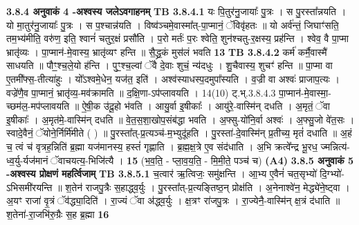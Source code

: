 \documentclass[17pt]{extarticle}
\begin{document}
{{{{{{{{{{{{{{{{{{{{{{                \textbf{ 3.8.4     अनुवाकं   4 -अश्वस्य जलेऽवगाहनम्} \newline
                                \textbf{ TB 3.8.4.1} \newline
                  यः पि॒तुर॑नु॒जायाः᳚ पु॒त्रः । स पु॒रस्ता᳚न्नयति । यो मा॒तुर॑नु॒जायाः᳚ पु॒त्रः । स प॒श्चान्न॑यति । विष्व॑ञ्चमे॒वास्मा᳚त्-पा॒प्मानं॒ ॅविवृ॑हतः ॥ यो अर्व॑न्तं॒ जिघाꣳ॑सति॒ तम॒भ्य॑मीति॒ वरु॑ण॒ इति॒ श्वानं॑ चतुर॒क्षं प्रसौ॑ति । प॒रो मर्तः॑ प॒रः श्वेति॒ शुन॑श्चतु-र॒क्षस्य॒ प्रह॑न्ति । श्वेव॒ वै पा॒प्मा भ्रातृ॑व्यः । पा॒प्मान॑-मे॒वास्य॒ भ्रातृ॑व्यꣳ हन्ति ॥ सै॒द्ध्र॒कं मुस॑लं भवति \textbf{ 13} \newline
                  \newline
                                \textbf{ TB 3.8.4.2} \newline
                  कर्म॑ कर्मै॒वास्मै॑ साधयति ॥ पौꣳ॒॒श्च॒ले॒यो ह॑न्ति । पुꣳ॒॒श्च॒ल्वां ॅवै दे॒वाः शुचं॒ न्य॑दधुः । शु॒चैवास्य॒ शुचꣳ॑ हन्ति ॥ पा॒प्मा वा ए॒तमी᳚फ्स॒-तीत्या॑हुः । यो᳚ऽश्वमे॒धेन॒ यज॑त॒ इति॑ । अश्व॑स्याधस्प॒दमुपा᳚स्यति । व॒ज्री वा अश्वः॑ प्राजाप॒त्यः । वज्रे॑णै॒व पा॒प्मानं॒ भ्रातृ॑व्य॒-मव॑क्रामति ॥ द॒क्षि॒णा-ऽप॑प्लावयति । 14(10) ट्.भ्.3.8.4.3 पा॒प्मान॑-मे॒वास्मा॒-च्छम॑ल॒-मप॑प्लावयति ॥ ऐ॒षी॒क उ॑दू॒हो भ॑वति । आयु॒र्वा इ॒षीकाः᳚ । आयु॑रे॒-वास्मि॑न् दधति । अ॒मृतं॒ ॅवा इ॒षीकाः᳚ । अ॒मृत॑मे॒-वास्मि॑न् दधति ॥ वे॒त॒स॒शा॒खोप॒संब॑द्धा भवति । अ॒फ्सु-यो॑नि॒र्वा अश्वः॑ । अ॒फ्सु॒जो वे॑त॒सः । स्वादे॒वैनं॒ ॅयोने॒र्निर्मि॑मीते ( ) ॥ पु॒रस्ता᳚त्-प्र॒त्यञ्च॑-म॒भ्युदू॑हति । पु॒रस्ता॑-दे॒वास्मि॑न् प्र॒तीच्य॒ मृतं॑ दधाति ॥ अ॒हं च॒ त्वं च॑ वृत्रह॒न्निति॑ ब्र॒ह्मा यज॑मानस्य॒ हस्तं॑ गृह्णाति । ब्र॒ह्म॒क्ष॒त्रे ए॒व संद॑धाति । अ॒भि क्रत्वे᳚न्द्र भू॒रध॒ ज्मन्नित्य॑-ध्व॒र्यु-र्यज॑मानं ॅवाचयत्य॒-भिजि॑त्यै । \textbf{ 15} \newline
                  \newline
                                    (भ॒व॒ति॒ - प्ला॒व॒य॒ति॒ - मि॒मी॒ते॒ पञ्च॑ च) \textbf{(A4)} \newline \newline
                \textbf{ 3.8.5     अनुवाकं   5 -अश्वस्य प्रोक्षणं महर्त्विजाम्} \newline
                                \textbf{ TB 3.8.5.1} \newline
                  च॒त्वार॑ ऋ॒त्विजः॒ समु॑क्षन्ति । आ॒भ्य ए॒वैनं॑ चत॒सृभ्यो॑ दि॒ग्भ्यो॑-ऽभिसमी॑रयन्ति ॥ श॒तेन॑ राजपु॒त्रैः स॒हाद्ध्व॒र्युः । पु॒रस्ता᳚त्-प्र॒त्यङ्तिष्ठ॒न् प्रोक्ष॑ति । अ॒नेनाश्वे॑न॒ मेद्ध्ये॑ने॒ष्ट्वा । अ॒यꣳ राजा॑ वृ॒त्रं ॅव॑द्ध्या॒दिति॑ । रा॒ज्यं ॅवा अ॑द्ध्व॒र्युः । क्ष॒त्रꣳ रा॑जपु॒त्रः । रा॒ज्येनै॒-वास्मि॑न् क्ष॒त्रं द॑धाति ॥ श॒तेना॑-रा॒जभि॑रु॒ग्रैः स॒ह ब्र॒ह्मा \textbf{ 16} \newline
}}}}}}}}}}}}}}}}}}}}}}
\end{document}
